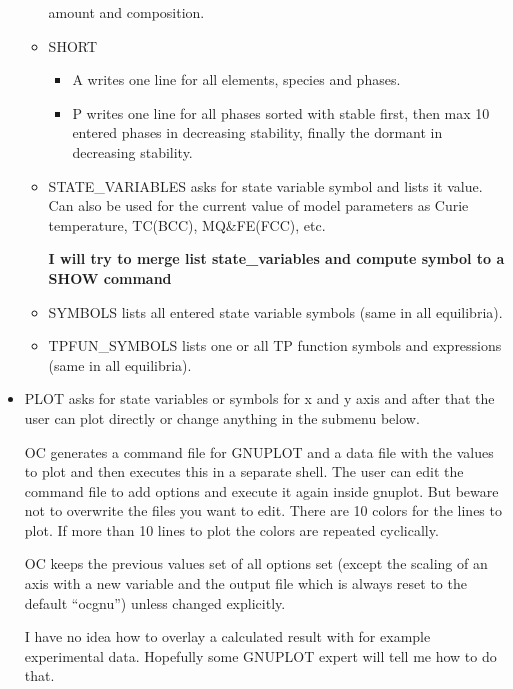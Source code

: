 \documentclass[12pt]{article}
\begin{document}
\begin{itemize}
\begin{itemize}
    amount and composition.
  \item SHORT
    \begin{itemize}
    \item A writes one line for all elements, species and
      phases.
    \item P writes one line for all phases sorted with stable first,
      then max 10 entered phases in decreasing stability, finally the
      dormant in decreasing stability.
    \end{itemize}
  \item STATE\_VARIABLES asks for state variable symbol and lists it
    value.  Can also be used for the current value of model parameters
    as Curie temperature, TC(BCC), MQ\&FE(FCC), etc.

    {\bf I will try to merge list state\_variables and compute symbol
      to a SHOW command}
  \item SYMBOLS lists all entered state variable symbols (same in all
    equilibria).
  \item TPFUN\_SYMBOLS lists one or all TP function symbols and
    expressions (same in all equilibria).
  \end{itemize}
\item PLOT asks for state variables or symbols for x and y axis and
  after that the user can plot directly or change anything in the
  submenu below.  

  OC generates a command file for GNUPLOT and a data file with the
  values to plot and then executes this in a separate shell.  The user
  can edit the command file to add options and execute it again inside
  gnuplot.  But beware not to overwrite the files you want to edit.
  There are 10 colors for the lines to plot.  If more than 10 lines to
  plot the colors are repeated cyclically.

  OC keeps the previous values set of all options set (except the
  scaling of an axis with a new variable and the output file which is
  always reset to the default ``ocgnu'') unless changed explicitly.

  I have no idea how to overlay a calculated result with for example
  experimental data.  Hopefully some GNUPLOT expert will tell me how
  to do that.


\end{itemize}
\end{document}
